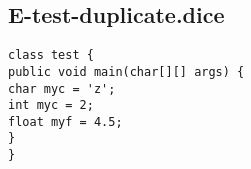 \subsection{E-test-duplicate.dice}
\begin{verbatim}
class test {
public void main(char[][] args) {
char myc = 'z';
int myc = 2;
float myf = 4.5;
}
}
\end{verbatim}